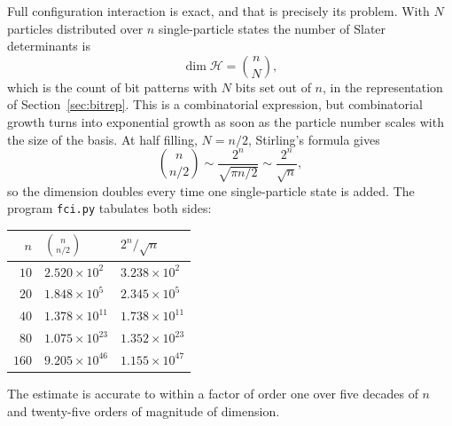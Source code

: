 Full configuration interaction is exact, and that is precisely its problem.
With $N$ particles distributed over $n$ single-particle states the number of
Slater determinants is
\begin{equation}
  \dim\mathcal{H} = \binom{n}{N},
  \label{eq:5-dimension}
\end{equation}
which is the count of bit patterns with $N$ bits set out of $n$, in the
representation of Section~\ref{sec:bitrep}.  This is a combinatorial
expression, but combinatorial growth turns into exponential growth as soon as
the particle number scales with the size of the basis.  At half filling,
$N=n/2$, Stirling's formula gives
\begin{equation}
  \binom{n}{n/2} \sim \frac{2^{n}}{\sqrt{\pi n/2}} \sim \frac{2^{n}}{\sqrt{n}},
  \label{eq:5-stirling}
\end{equation}
so the dimension doubles every time one single-particle state is added.  The
program \texttt{fci.py} tabulates both sides:
\begin{center}
\renewcommand{\arraystretch}{1.15}
\begin{tabular}{rll}
\toprule
$n$ & $\binom{n}{n/2}$ & $2^{n}/\sqrt{n}$\\
\midrule
$10$  & $2.520\times10^{2}$  & $3.238\times10^{2}$\\
$20$  & $1.848\times10^{5}$  & $2.345\times10^{5}$\\
$40$  & $1.378\times10^{11}$ & $1.738\times10^{11}$\\
$80$  & $1.075\times10^{23}$ & $1.352\times10^{23}$\\
$160$ & $9.205\times10^{46}$ & $1.155\times10^{47}$\\
\bottomrule
\end{tabular}
\end{center}
The estimate is accurate to within a factor of order one over five decades of
$n$ and twenty-five orders of magnitude of dimension.

